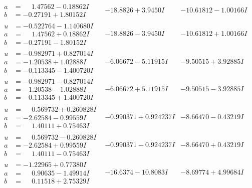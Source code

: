 \documentclass[1p]{elsarticle_modified}
\theoremstyle{definition}
\begin{document}
$$\begin{array}{c|c|c}
\begin{aligned}
a &= \phantom{-}1.47562 - 0.18862 I \\
b &= -0.27191 + 1.80152 I\end{aligned}
 & -18.8826 + 3.9450 I & -10.61812 - 1.00166 I \\ \hline\begin{aligned}
u &= -0.522764 - 1.140680 I \\
a &= \phantom{-}1.47562 + 0.18862 I \\
b &= -0.27191 - 1.80152 I\end{aligned}
 & -18.8826 - 3.9450 I & -10.61812 + 1.00166 I \\ \hline\begin{aligned}
u &= -0.982971 + 0.827014 I \\
a &= -1.20538 + 1.02888 I \\
b &= -0.113345 - 1.400720 I\end{aligned}
 & -6.06672 - 5.11915 I & -9.50515 + 3.92885 I \\ \hline\begin{aligned}
u &= -0.982971 - 0.827014 I \\
a &= -1.20538 - 1.02888 I \\
b &= -0.113345 + 1.400720 I\end{aligned}
 & -6.06672 + 5.11915 I & -9.50515 - 3.92885 I \\ \hline\begin{aligned}
u &= \phantom{-}0.569732 + 0.260828 I \\
a &= -2.62584 - 0.99559 I \\
b &= \phantom{-}1.40111 + 0.75463 I\end{aligned}
 & -0.990371 + 0.924237 I & -8.66470 - 0.43219 I \\ \hline\begin{aligned}
u &= \phantom{-}0.569732 - 0.260828 I \\
a &= -2.62584 + 0.99559 I \\
b &= \phantom{-}1.40111 - 0.75463 I\end{aligned}
 & -0.990371 - 0.924237 I & -8.66470 + 0.43219 I \\ \hline\begin{aligned}
u &= -1.22965 + 0.77380 I \\
a &= \phantom{-}0.90635 - 1.49914 I \\
b &= \phantom{-}0.11518 + 2.75329 I\end{aligned}
 & -16.6374 - 10.8083 I & -8.69774 + 4.99684 I \\ \hline\begin{aligned}

\end{aligned}
\end{array}$$
\end{document}
